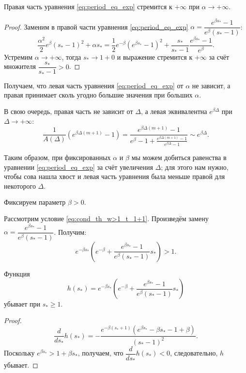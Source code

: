 %
\begin{proposition}
	Правая часть уравнения \eqref{eq:period_eq_exp} стремится к $+\infty$ при $\alpha \to +\infty$.
\end{proposition}
\begin{proof}
	Заменим в правой части уравнения \eqref{eq:period_eq_exp} $\alpha = \dfrac{e^{\beta s_*} - 1}{e^{\beta}(s_* - 1)}$:
	\begin{equation}
		\dfrac{\alpha^2}{2}e^{\beta}( s_* - 1)^2 + \alpha s_* = \dfrac{1}{2}e^{-\beta}(e^{\beta s_*} - 1)^2 + \dfrac{s_*}{s_* - 1}\dfrac{e^{\beta s_*} - 1}{e^{\beta}}.
	\end{equation}
	Устремим $\alpha \to +\infty$, тогда $s_* \to 1 + 0$ и выражение стремится к $+\infty$ за счёт множителя $\dfrac{s_*}{s_* - 1} > 0$.
\end{proof}

Получаем, что левая часть уравнения \eqref{eq:period_eq_exp} от $\alpha$ не зависит, а правая принимает сколь угодно большие значения при больших $\alpha$.

В свою очередь, правая часть не зависит от $\Delta$, а левая эквивалентна $e^{\beta\Delta}$ при $\Delta \to +\infty$:
$$
\dfrac{1}{A(\Delta)}\left(e^{\beta\Delta(m + 1)} - 1\right) = \dfrac{e^{\beta\Delta(m + 1)} - 1}{e^{\beta} - 1 + \frac{e^{\beta\Delta(m + 1)} - 1}{e^{\beta\Delta} - 1}} \sim e^{\beta \Delta}.
$$

Таким образом, при фиксированных $\alpha$ и $\beta$ мы можем добиться равенства в уравнении \eqref{eq:period_eq_exp} за счёт увеличения $\Delta$; для этого нам нужно, чтобы сова нашла хвост и левая часть уравнения была меньше правой для некоторого $\Delta$.

Фиксируем параметр $\beta > 0$.

Рассмотрим условие \eqref{eq:cond_th_w>1_t_1+1}. Произведём замену $\alpha = \dfrac{e^{\beta s_*} - 1}{e^{\beta}(s_* - 1)}$. Получим: 
\begin{equation}
	e^{-\beta  s_*} \left(e^{-\beta} + \frac{e^{\beta s_*} - 1}{e^{\beta}(s_* - 1)}s_*\right) > 1.
\end{equation}
%

\begin{proposition}
	Функция 
	\begin{equation}
		h(s_*) = e^{-\beta  s_*} \left(e^{-\beta} + \frac{e^{\beta s_*} - 1}{e^{\beta}(s_* - 1)}s_*\right)
	\end{equation}
	убывает при $s_* \geqslant 1$.
\end{proposition}
%
\begin{proof}
	\begin{equation}
		\dfrac{d}{ds_*}h(s_*) = -\dfrac{e^{-\beta(s_* + 1)} (e^{\beta s_*} - \beta s_* - 1 + \beta)}{(s_* - 1)^2}.
	\end{equation}
	Поскольку $e^{\beta s_*} > 1 + \beta s_*$, получаем, что $\dfrac{d}{ds_*}h(s_*) < 0$, следовательно, $h$ убывает.
\end{proof}

